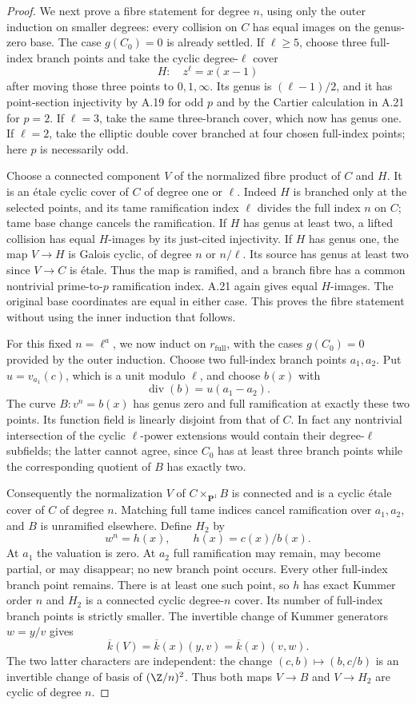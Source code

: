 \begin{proof}
We next prove a fibre statement for degree $n$, using only
the outer induction on smaller degrees: every collision
on $C$ has equal images on the genus-zero base. The case
$g(C_0)=0$ is already settled. If $\ell\ge5$, choose three
full-index branch points and take the cyclic
degree-$\ell$ cover
\[
 H:\quad z^\ell=x(x-1)
\]
after moving those three points to $0,1,\infty$. Its genus
is $(\ell-1)/2$, and it has point-section injectivity by
A.19 for odd $p$ and by the Cartier calculation in A.21
for $p=2$. If $\ell=3$, take the same three-branch cover,
which now has genus one. If $\ell=2$, take the elliptic
double cover branched at four chosen full-index points;
here $p$ is necessarily odd.

Choose a connected component $V$ of the normalized fibre
product of $C$ and $H$. It is an \'etale cyclic cover of
$C$ of degree one or $\ell$. Indeed $H$ is branched only
at the selected points, and its tame ramification index
$\ell$ divides the full index $n$ on $C$; tame base change
cancels the ramification. If $H$ has genus at least two,
a lifted collision has equal $H$-images by its just-cited
injectivity. If $H$ has genus one, the map $V\to H$ is
Galois cyclic, of degree $n$ or $n/\ell$. Its source has
genus at least two since $V\to C$ is \'etale. Thus the
map is ramified, and a branch fibre has a common
nontrivial prime-to-$p$ ramification index. A.21 again
gives equal $H$-images. The original base coordinates are
equal in either case. This proves the fibre statement
without using the inner induction that follows.

For this fixed $n=\ell^a$, we now induct on
$r_{\mathrm{full}}$, with the cases $g(C_0)=0$ provided
by the outer induction. Choose two full-index branch
points $a_1,a_2$. Put $u=v_{a_1}(c)$, which is a unit
modulo $\ell$, and choose $b(x)$ with
\[
 \operatorname{div}(b)=u(a_1-a_2).
\]
The curve $B:v^n=b(x)$ has genus zero and full
ramification at exactly these two points. Its function
field is linearly disjoint from that of $C$. In fact any
nontrivial intersection of the cyclic $\ell$-power
extensions would contain their degree-$\ell$ subfields;
the latter cannot agree, since $C_0$ has at least three
branch points while the corresponding quotient of $B$
has exactly two.

Consequently the normalization $V$ of $C\times_{\mathbf
P^1}B$ is connected and is a cyclic \'etale cover of $C$
of degree $n$. Matching full tame indices cancel
ramification over $a_1,a_2$, and $B$ is unramified
elsewhere. Define $H_2$ by
\[
 w^n=h(x),\qquad h(x)=c(x)/b(x).
\]
At $a_1$ the valuation is zero. At $a_2$ full ramification
may remain, may become partial, or may disappear; no new
branch point occurs. Every other full-index branch point
remains. There is at least one such point, so $h$ has
exact Kummer order $n$ and $H_2$ is a connected cyclic
degree-$n$ cover. Its number of full-index branch points
is strictly smaller. The invertible change of Kummer
generators $w=y/v$ gives
\[
 \overline k(V)=\overline k(x)(y,v)
              =\overline k(x)(v,w).                       \tag{A.15}
\]
The two latter characters are independent: the change
$(c,b)\mapsto(b,c/b)$ is an invertible change of basis of
$(\Z/n)^2$. Thus both maps $V\to B$ and $V\to H_2$ are
cyclic of degree $n$.


\end{proof}

